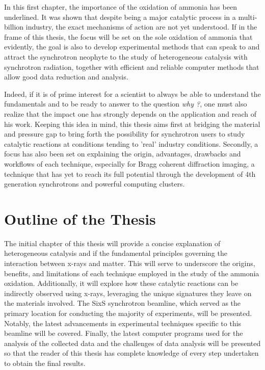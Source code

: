 In this first chapter, the importance of the oxidation of ammonia has been underlined.
It was shown that despite being a major catalytic process in a multi-billion industry, the exact mechanisms of action are not yet understood.
If in the frame of this thesis, the focus will be set on the sole oxidation of ammonia that evidently, the goal is also to develop experimental methods that can speak to and attract the synchrotron neophyte to the study of heterogeneous catalysis with synchrotron radiation, together with efficient and reliable computer methods that allow good data reduction and analysis.

Indeed, if it is of prime interest for a scientist to always be able to understand the fundamentals and to be ready to answer to the question \textit{why ?}, one must also realize that the impact one has strongly depends on the application and reach of his work.
Keeping this idea in mind, this thesis aims first at bridging the material and pressure gap to bring forth the possibility for synchrotron users to study catalytic reactions at conditions tending to 'real' industry conditions.
Secondly, a focus has also been set on explaining the origin, advantages, drawbacks and workflows of each technique, especially for Bragg coherent diffraction imaging, a technique that has yet to reach its full potential through the development of 4th generation synchrotrons and powerful computing clusters.

\section{Outline of the Thesis}

The initial chapter of this thesis will provide a concise explanation of heterogeneous catalysis and if the fundamental principles governing the interaction between x-rays and matter.
This will serve to underscore the origins, benefits, and limitations of each technique employed in the study of the ammonia oxidation.
Additionally, it will explore how these catalytic reactions can be indirectly observed using x-rays, leveraging the unique signatures they leave on the materials involved.
The SixS synchrotron beamline, which served as the primary location for conducting the majority of experiments, will be presented.
Notably, the latest advancements in experimental techniques specific to this beamline will be covered.
Finally, the latest computer programs used for the analysis of the collected data and the challenges of data analysis will be presented so that the reader of this thesis has complete knowledge of every step undertaken to obtain the final results.


